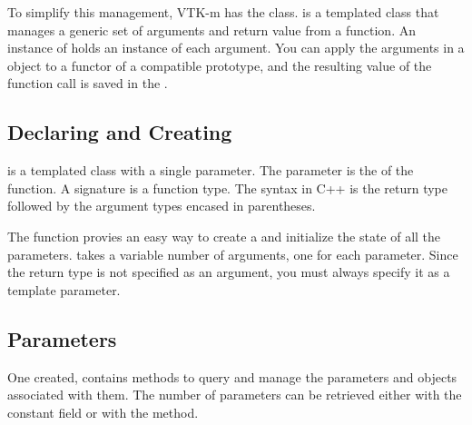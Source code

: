 
To simplify this management, VTK-m has the 
class.  is a templated class that manages
a generic set of arguments and return value from a function. An instance of
 holds an instance of each argument. You
can apply the arguments in a  object to a
functor of a compatible prototype, and the resulting value of the function
call is saved in the .

\subsection{Declaring and Creating}

 is a templated class with a single
parameter. The parameter is the 
  of the function. A signature is a
function type. The syntax in C++ is the return type followed by the
argument types encased in parentheses.


The  function provies an easy way to
create a  and initialize the state of all
the parameters.  takes a variable
number of arguments, one for each parameter. Since the return type is not
specified as an argument, you must always specify it as a template
parameter.


\subsection{Parameters}

One created,  contains methods to query
and manage the parameters and objects associated with them. The number of
parameters can be retrieved either with the constant field 
 or with the  method.


